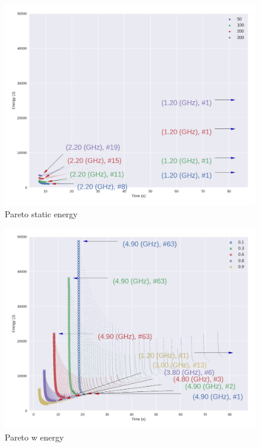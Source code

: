 \begin{figure}

	\centering

	\includegraphics[width=\columnwidth]{models/figures/analisys/pareto_static_low.png}

	\caption{Pareto static energy}

	\label{fig:pareto_static_l}

\end{figure}



\begin{figure}

	\centering

	\includegraphics[width=\columnwidth]{models/figures/analisys/pareto_w_high.png}

	\caption{Pareto w energy}

	\label{fig:pareto_w_h}

\end{figure}


